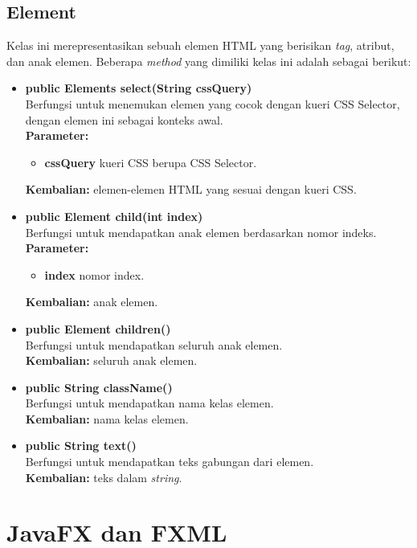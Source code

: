 \subsection{Element}
Kelas ini merepresentasikan sebuah elemen HTML yang berisikan \textit{tag}, atribut, dan anak elemen. Beberapa \textit{method} yang dimiliki kelas ini adalah sebagai berikut:
\begin{itemize}
    	\item \textbf{public Elements select(String cssQuery)} \\
		Berfungsi untuk menemukan elemen yang cocok dengan kueri CSS Selector, dengan elemen ini sebagai konteks awal. \\
		\textbf{Parameter:} 
		\begin{itemize}
			\item \textbf{cssQuery} kueri CSS berupa CSS Selector.
		\end{itemize}
		\textbf{Kembalian:} elemen-elemen HTML yang sesuai dengan kueri CSS.	

    	\item \textbf{public Element child(int index)} \\
		Berfungsi untuk mendapatkan anak elemen berdasarkan nomor indeks. \\
		\textbf{Parameter:} 
		\begin{itemize}
			\item \textbf{index} nomor index.
		\end{itemize}
		\textbf{Kembalian:} anak elemen.	
		
		\item \textbf{public Element children()} \\
		Berfungsi untuk mendapatkan seluruh anak elemen. \\
		\textbf{Kembalian:} seluruh anak elemen.	
		
		\item \textbf{public String className()} \\
		Berfungsi untuk mendapatkan nama kelas elemen. \\
		\textbf{Kembalian:} nama kelas elemen.	
		
		\item \textbf{public String text()} \\
		Berfungsi untuk mendapatkan teks gabungan dari elemen. \\
		\textbf{Kembalian:} teks dalam \textit{string}.	
\end{itemize}

\section{JavaFX dan FXML}
